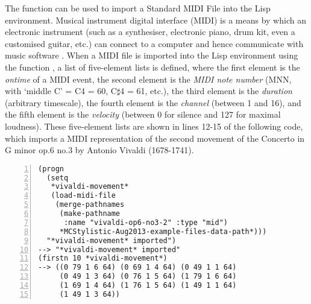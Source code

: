 The function  can be used to import a Standard MIDI File into the Lisp environment. Musical instrument digital interface (MIDI) is a means by which an electronic instrument (such as a synthesiser, electronic piano, drum kit, even a customised guitar, etc.) can connect to a computer and hence communicate with music software \citep*{roads1996}. When a MIDI file is imported into the Lisp environment using the function , a list of five-element lists is defined, where the first element is the \emph{ontime} of a MIDI event, the second element is the \emph{MIDI note number} (MNN, with `middle C' = C4 = 60, C$\sharp$4 = 61, etc.), the third element is the \emph{duration} (arbitrary timescale), the fourth element is the \emph{channel} (between 1 and 16), and the fifth element is the \emph{velocity} (between 0 for silence and 127 for maximal loudness). These five-element lists are shown in lines 12-15 of the following code, which imports a MIDI representation of the second movement of the Concerto in G minor op.6 no.3 by Antonio Vivaldi (1678-1741).
\begin{Verbatim}[frame=single,numbers=left]
(progn
  (setq
   *vivaldi-movement*
   (load-midi-file
    (merge-pathnames
     (make-pathname
      :name "vivaldi-op6-no3-2" :type "mid")
     *MCStylistic-Aug2013-example-files-data-path*)))
  "*vivaldi-movement* imported")
--> "*vivaldi-movement* imported"
(firstn 10 *vivaldi-movement*)
--> ((0 79 1 6 64) (0 69 1 4 64) (0 49 1 1 64)
     (0 49 1 3 64) (0 76 1 5 64) (1 79 1 6 64)
     (1 69 1 4 64) (1 76 1 5 64) (1 49 1 1 64)
     (1 49 1 3 64))
\end{Verbatim}

